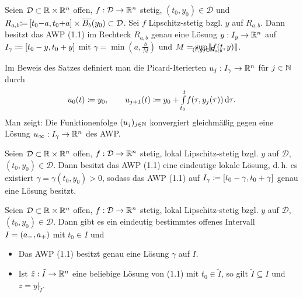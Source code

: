 \documentclass{cheat-sheet}
\newcommand{\D}{\mathcal{D}}
\begin{document}

\begin{satz}
  Seien $\D \subset \R \times \R^n$ offen, $f : \D \to \R^n$ stetig, $(t_0, y_0) {\in} \D$ und $R_{a,b} {\coloneqq} \cinterval{ t_0 {-} a }{ t_0 {+} a } \times \overline{B_b}(y_0) \subset \D$. Sei $f$ Lipschitz-stetig bzgl. $y$ auf $R_{a,b}$. Dann besitzt das AWP (1.1) im Rechteck $R_{a,b}$ genau eine Lösung $y : I_y \to \mathbb{R}^n$ auf $I_{\gamma} \coloneqq \left[ t_0 - y, t_0 + y \right]$ mit $\gamma = \min(a, \tfrac{b}{M})$ und $M = \sup_{\mathclap{(t,y) \in R_{a,b}}} \norm{f(t, y)}$.
\end{satz}

\begin{bem}
  Im Beweis des Satzes definiert man die Picard-Iterierten $u_j : I_\gamma \to \mathbb{R}^n$ für $j \in \mathbb{N}$ durch
  \[
    u_0(t) \coloneqq y_0, \qquad
    u_{j+1}(t) \coloneqq y_0 + {\textstyle \int\limits_{t_0}^{t}} f(\tau, y_j(\tau)) \,\mathrm{d} \tau.
  \]
  Man zeigt: Die Funktionenfolge $(u_j)_{j \in \mathbb{N}}$ konvergiert gleichmäßig gegen eine Lösung $u_\infty : I_\gamma \to \mathbb{R}^n$ des AWP.
\end{bem}


\begin{satz}
  Seien $\D \subset \R \times \R^n$ offen, $f : \D \to \R^n$ stetig, lokal Lipschitz-stetig bzgl. $y$ auf $\D$, $(t_0, y_0) \in \D$. Dann besitzt das AWP (1.1) eine eindeutige lokale Lösung, d.\,h. es existiert $\gamma = \gamma(t_0, y_0) > 0$, sodass das AWP (1.1) auf $I_\gamma \coloneqq \left[ t_0 - \gamma, t_0 + \gamma \right]$ genau eine Lösung besitzt.
\end{satz}

\begin{satz}
  Seien $\D \subset \R \times \R^n$ offen, $f : \D \to \R^n$ stetig, lokal Lipschitz-stetig bzgl. $y$ auf $\D$, $(t_0, y_0) \in \D$. Dann gibt es ein eindeutig bestimmtes offenes Intervall $I = \left( a_-, a_+ \right)$ mit $t_0 {\in} I$ und
  \begin{itemize}
    \item Das AWP (1.1) besitzt genau eine Lösung $\gamma$ auf $I$.
    \item Ist $\tilde{z} : \tilde{I} \to \mathbb{R}^n$ eine beliebige Lösung von (1.1) mit $t_0 \in \tilde{I}$, so gilt $\tilde{I} \subseteq I$ und $z = y|_{\tilde{I}}$.
  \end{itemize}
\end{satz}
\end{document}
